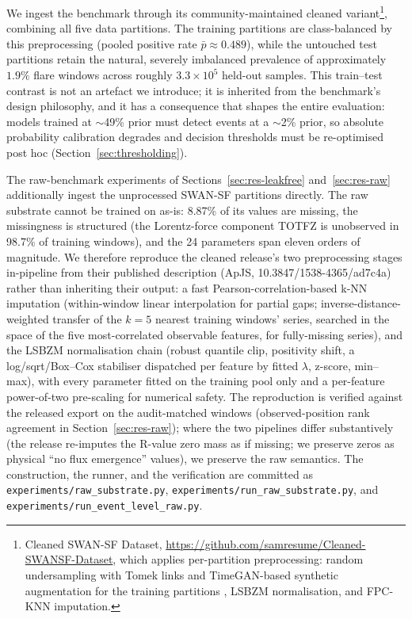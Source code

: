 We ingest the benchmark through its community-maintained cleaned
variant\footnote{Cleaned SWAN-SF Dataset,
\url{https://github.com/samresume/Cleaned-SWANSF-Dataset}, which
applies per-partition preprocessing: random undersampling with Tomek
links and TimeGAN-based synthetic augmentation for the training
partitions \cite{yoon2019}, LSBZM normalisation, and FPC-KNN
imputation.}, combining all five data partitions. The training
partitions are class-balanced by this preprocessing (pooled positive
rate $\bar{p} \approx 0.489$), while the untouched test partitions
retain the natural, severely imbalanced prevalence of approximately
$1.9\%$ flare windows across roughly $3.3\times10^{5}$ held-out
samples. This train--test contrast is not an artefact we introduce; it
is inherited from the benchmark's design philosophy, and it has a
consequence that shapes the entire evaluation: models trained at
$\sim$49\% prior must detect events at a $\sim$2\% prior, so absolute
probability calibration degrades and decision thresholds must be
re-optimised post hoc (Section~\ref{sec:thresholding}).

The raw-benchmark experiments of Sections~\ref{sec:res-leakfree}
and~\ref{sec:res-raw} additionally ingest the unprocessed SWAN-SF
partitions directly. The raw substrate cannot be trained on as-is:
8.87\% of its values are missing, the missingness is structured
(the Lorentz-force component TOTFZ is unobserved in 98.7\% of
training windows), and the 24 parameters span eleven orders of
magnitude. We therefore reproduce the cleaned release's two
preprocessing stages in-pipeline from their published description
(ApJS, 10.3847/1538-4365/ad7c4a) rather than inheriting their
output: a fast Pearson-correlation-based k-NN imputation (within-window
linear interpolation for partial gaps; inverse-distance-weighted
transfer of the $k{=}5$ nearest training windows' series, searched in
the space of the five most-correlated observable features, for
fully-missing series), and the LSBZM normalisation chain (robust
quantile clip, positivity shift, a log/sqrt/Box--Cox stabiliser
dispatched per feature by fitted $\lambda$, z-score, min--max), with
every parameter fitted on the training pool only and a per-feature
power-of-two pre-scaling for numerical safety. The reproduction is
verified against the released export on the audit-matched windows
(observed-position rank agreement in
Section~\ref{sec:res-raw}); where the two pipelines differ
substantively (the release re-imputes the R-value zero mass as if
missing; we preserve zeros as physical ``no flux emergence''
values), we preserve the raw semantics. The construction, the
runner, and the verification are committed as
\texttt{experiments/raw\_substrate.py},
\texttt{experiments/run\_raw\_substrate.py}, and
\texttt{experiments/run\_event\_level\_raw.py}.

